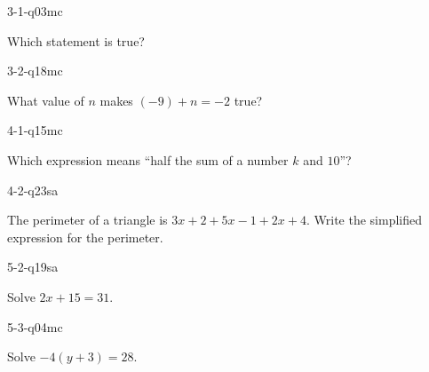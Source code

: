 \begin{practiceQuestion}{3-1-q03}{mc}
\begin{questionText}
Which statement is true?
\end{questionText}
\end{practiceQuestion}

\begin{practiceQuestion}{3-2-q18}{mc}
\begin{questionText}
What value of $n$ makes $(-9) + n = -2$ true?
\end{questionText}
\end{practiceQuestion}

\begin{practiceQuestion}{4-1-q15}{mc}
\begin{questionText}
Which expression means ``half the sum of a number $k$ and $10$''?
\end{questionText}
\end{practiceQuestion}

\begin{practiceQuestion}{4-2-q23}{sa}
\begin{questionText}
The perimeter of a triangle is $3x + 2 + 5x - 1 + 2x + 4$. Write the simplified expression for the perimeter.
\end{questionText}
\end{practiceQuestion}

\begin{practiceQuestion}{5-2-q19}{sa}
\begin{questionText}
Solve $2x + 15 = 31$.
\end{questionText}
\end{practiceQuestion}

\begin{practiceQuestion}{5-3-q04}{mc}
\begin{questionText}
Solve $-4(y + 3) = 28$.
\end{questionText}
\end{practiceQuestion}

